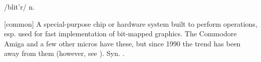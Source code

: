  /blit'r/ n.

[common] A special-purpose chip or hardware system built to perform
 operations, esp. used for fast implementation of bit-mapped
graphics. The Commodore Amiga and a few other micros have these, but since 1990
the trend has been away from them (however, see ). Syn. .

